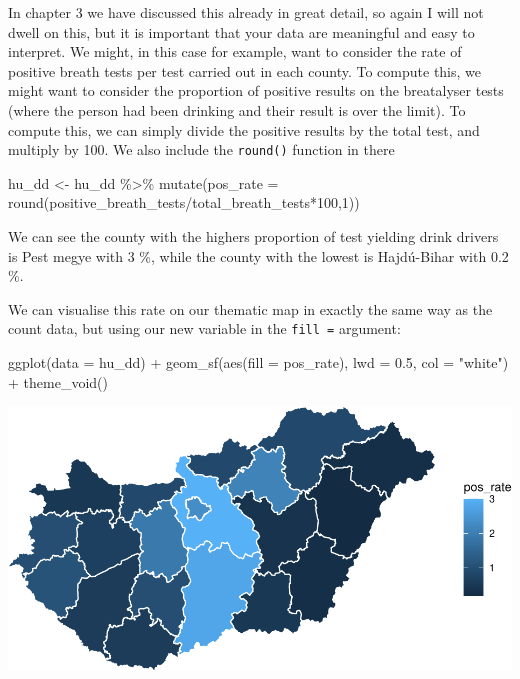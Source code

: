 \documentclass[
]{book}
\makeatletter
\newenvironment{Shaded}{\begin{snugshade}}{\end{snugshade}}
\newcommand{\AttributeTok}[1]{\textcolor[rgb]{0.61,0.61,0.61}{#1}}
\newcommand{\DecValTok}[1]{\textcolor[rgb]{0.06,0.06,0.06}{#1}}
\newcommand{\FloatTok}[1]{\textcolor[rgb]{0.06,0.06,0.06}{#1}}
\newcommand{\FunctionTok}[1]{\textcolor[rgb]{0,0,0}{#1}}
\newcommand{\NormalTok}[1]{#1}
\newcommand{\OtherTok}[1]{\textcolor[rgb]{0.37,0.37,0.37}{#1}}
\newcommand{\SpecialCharTok}[1]{\textcolor[rgb]{0,0,0}{#1}}
\newcommand{\StringTok}[1]{\textcolor[rgb]{0.5,0.5,0.5}{#1}}
\newenvironment{kframe}{%
\medskip{}
\setlength{\fboxsep}{.8em}
 \def\at@end@of@kframe{}%
 \ifinner\ifhmode%
  \def\at@end@of@kframe{\end{minipage}}%
  \begin{minipage}{\columnwidth}%
 \fi\fi%
 \def\FrameCommand##1{\hskip\@totalleftmargin \hskip-\fboxsep
 \colorbox{shadecolor}{##1}\hskip-\fboxsep
     \hskip-\linewidth \hskip-\@totalleftmargin \hskip\columnwidth}%
 \MakeFramed {\advance\hsize-\width
   \@totalleftmargin\z@ \linewidth\hsize
   \@setminipage}}%
 {\par\unskip\endMakeFramed%
 \at@end@of@kframe}
\renewenvironment{Shaded}{\begin{kframe}}{\end{kframe}}
\makeatother
\begin{document}
In chapter 3 we have discussed this already in great detail, so again I will not dwell on this, but it is important that your data are meaningful and easy to interpret. We might, in this case for example, want to consider the rate of positive breath tests per test carried out in each county. To compute this, we might want to consider the proportion of positive results on the breatalyser tests (where the person had been drinking and their result is over the limit). To compute this, we can simply divide the positive results by the total test, and multiply by 100. We also include the \texttt{round()} function in there

\begin{Shaded}
\begin{Highlighting}[]
\NormalTok{hu\_dd }\OtherTok{\textless{}{-}}\NormalTok{ hu\_dd }\SpecialCharTok{\%\textgreater{}\%} 
  \FunctionTok{mutate}\NormalTok{(}\AttributeTok{pos\_rate =} \FunctionTok{round}\NormalTok{(positive\_breath\_tests}\SpecialCharTok{/}\NormalTok{total\_breath\_tests}\SpecialCharTok{*}\DecValTok{100}\NormalTok{,}\DecValTok{1}\NormalTok{))}
\end{Highlighting}
\end{Shaded}

We can see the county with the highers proportion of test yielding drink drivers is Pest megye with 3 \%, while the county with the lowest is Hajdú-Bihar with 0.2 \%.

We can visualise this rate on our thematic map in exactly the same way as the count data, but using our new variable in the \texttt{fill\ =} argument:

\begin{Shaded}
\begin{Highlighting}[]
\FunctionTok{ggplot}\NormalTok{(}\AttributeTok{data =}\NormalTok{ hu\_dd) }\SpecialCharTok{+} 
  \FunctionTok{geom\_sf}\NormalTok{(}\FunctionTok{aes}\NormalTok{(}\AttributeTok{fill =}\NormalTok{ pos\_rate), }\AttributeTok{lwd =} \FloatTok{0.5}\NormalTok{, }\AttributeTok{col =} \StringTok{"white"}\NormalTok{) }\SpecialCharTok{+} 
  \FunctionTok{theme\_void}\NormalTok{()}
\end{Highlighting}
\end{Shaded}

\includegraphics{crime_mapping_files/figure-latex/themmapratefill-1.pdf}
\end{document}
